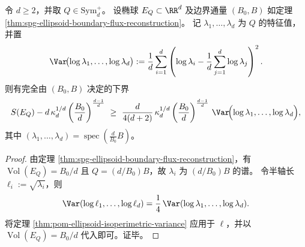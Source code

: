 \begin{corollary}[纯边界通量的等周证书]\label{cor:pom-ellipsoid-isoperimetric-boundary-certificate}
令 \(d\ge 2\)，并取 \(Q\in\mathrm{Sym}_d^+\)。
设椭球 \(E_Q\subset\RR^d\) 及边界通量 \((B_0,B)\) 如定理 \ref{thm:spg-ellipsoid-boundary-flux-reconstruction}。
记 \(\lambda_1,\dots,\lambda_d\) 为 \(Q\) 的特征值，并置
\[
\Var\!\bigl(\log\lambda_1,\dots,\log\lambda_d\bigr)
:=\frac1d\sum_{i=1}^{d}\left(\log\lambda_i-\frac1d\sum_{j=1}^d\log\lambda_j\right)^2.
\]
则有完全由 \((B_0,B)\) 决定的下界
\[
S(E_Q)-d\,\kappa_d^{1/d}\left(\frac{B_0}{d}\right)^{\frac{d-1}{d}}
\ \ge\
\frac{d}{4(d+2)}\,\kappa_d^{1/d}\left(\frac{B_0}{d}\right)^{\frac{d-1}{d}}\,
\Var\!\Bigl(\log\lambda_1,\dots,\log\lambda_d\Bigr),
\]
其中 \((\lambda_1,\dots,\lambda_d)=\operatorname{spec}\!\left(\frac{d}{B_0}B\right)\)。
\end{corollary}
\begin{proof}
由定理 \ref{thm:spg-ellipsoid-boundary-flux-reconstruction}，有 \(\operatorname{Vol}(E_Q)=B_0/d\) 且 \(Q=(d/B_0)B\)，故 \(\lambda_i\) 为 \((d/B_0)B\) 的谱。
令半轴长 \(\ell_i:=\sqrt{\lambda_i}\)，则
\[
\Var(\log\ell_1,\dots,\log\ell_d)=\frac14\,\Var(\log\lambda_1,\dots,\log\lambda_d).
\]
将定理 \ref{thm:pom-ellipsoid-isoperimetric-variance} 应用于 \(\ell\)，并以 \(\operatorname{Vol}(E_Q)=B_0/d\) 代入即可。证毕。
\end{proof}

